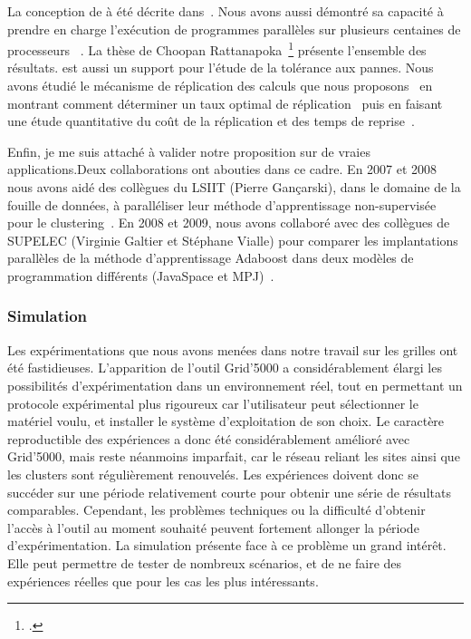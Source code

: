 La conception de {\pmpi}  à été décrite dans~\cite{icps-2007-182,icps-2005-155}.
Nous  avons aussi  démontré  sa  capacité à  prendre  en  charge l'exécution  de
programmes    parallèles    sur     plusieurs    centaines    de    processeurs~
\cite{icps-2008-193}. La  thèse de  Choopan Rattanapoka~\footcite{icps-2008-208}
présente l'ensemble des résultats. {\pmpi} est  aussi un support pour l'étude de
la  tolérance aux  pannes. Nous  avons étudié  le mécanisme  de réplication  des
calculs que  nous proposons~\cite{icps-2007-185} en montrant  comment déterminer
un taux  optimal de réplication~\cite{icps-2009-217}  puis en faisant  une étude
quantitative    du    coût    de    la   réplication    et    des    temps    de
reprise~\cite{icps-2009-214}.

Enfin,  je  me   suis  attaché  à  valider  notre  proposition   sur  de  vraies
applications.Deux collaborations  ont abouties dans  ce cadre.  En 2007  et 2008
nous avons aidé des collègues du LSIIT (Pierre Gançarski), dans le domaine de la
fouille de  données, à paralléliser leur  méthode d'apprentissage non-supervisée
pour le clustering~\cite{icps-2008-188}.  En 2008  et 2009, nous avons collaboré
avec  des  collègues de  SUPELEC  (Virginie  Galtier  et Stéphane  Vialle)  pour
comparer  les implantations  parallèles de  la méthode  d'apprentissage Adaboost
dans    deux    modèles    de    programmation    différents    (JavaSpace    et
MPJ)~\cite{icps-2009-219}.


\subsubsection{Simulation}
\label{sc:simulation}

Les expérimentations  que nous avons menées  dans notre travail sur  les grilles
ont  été  fastidieuses. L'apparition  de  l'outil  Grid'5000 a  considérablement
élargi les  possibilités d'expérimentation dans  un environnement réel,  tout en
permettant  un  protocole expérimental  plus  rigoureux  car l'utilisateur  peut
sélectionner le  matériel voulu, et  installer le système d'exploitation  de son
choix. Le  caractère reproductible des  expériences a donc  été considérablement
amélioré avec Grid'5000,  mais reste néanmoins imparfait, car  le réseau reliant
les sites ainsi que les clusters sont régulièrement renouvelés.  Les expériences
doivent donc  se succéder sur une  période relativement courte pour  obtenir une
série  de  résultats comparables.  Cependant,  les  problèmes techniques  ou  la
difficulté  d'obtenir l'accès  à l'outil  au moment  souhaité peuvent  fortement
allonger  la  période  d'expérimentation.   La simulation  présente  face  à  ce
problème un grand intérêt. Elle peut  permettre de tester de nombreux scénarios,
et de ne faire des expériences réelles que pour les cas les plus intéressants.\\

